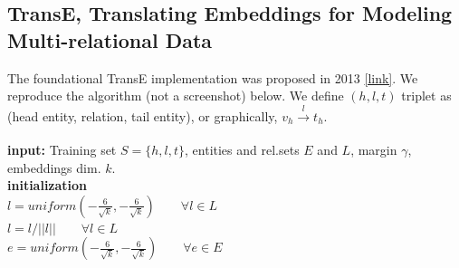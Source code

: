 \subsection{TransE, Translating Embeddings for Modeling Multi-relational Data} \label{ss_52_transe}

The foundational TransE implementation was proposed in 2013 \href{https://everest.hds.utc.fr/lib/exe/fetch.php?media=en:cr_paper_nips13.pdf}{[link]}. We reproduce the algorithm (not a screenshot) below. We define $(h, l ,t)$ triplet as (head entity, relation, tail entity), or graphically, $v_h \xrightarrow[]{l} t_h$.

\begin{algorithm}[H]
\SetAlgoLined
\textbf{input:} Training set $S=\{h, l, t\}$, entities and rel.sets $E$ and $L$, margin $\gamma$, embeddings dim. $k$. \\
\textbf{initialization} \\
\hspace*{\algorithmicindent} $l = uniform(-\frac{6}{\sqrt{k}}, -\frac{6}{\sqrt{k}}) \qquad  \forall l \in L$  \\
\hspace*{\algorithmicindent} $l = l / ||l|| \qquad \forall l \in L$ \\
\hspace*{\algorithmicindent} $e = uniform(-\frac{6}{\sqrt{k}}, -\frac{6}{\sqrt{k}}) \qquad \forall e \in E$ \\
\end{algorithm}

